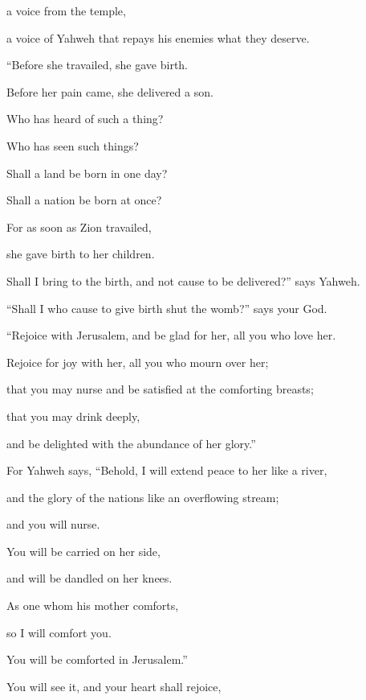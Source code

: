 {\par }{\QB a voice from the temple,
\par }{\QB a voice of Yahweh that repays his enemies what they deserve.
\par }{\BB \par }{\Q {}“Before she travailed, she gave birth.
\par }{\QB Before her pain came, she delivered a son.
\par }{\Q {}Who has heard of such a thing?
\par }{\QB Who has seen such things?
\par }{\Q Shall a land be born in one day?
\par }{\QB Shall a nation be born at once?
\par }{\Q For as soon as Zion travailed,
\par }{\QB she gave birth to her children.
\par }{\Q {}Shall I bring to the birth, and not cause to be delivered?” says Yahweh.
\par }{\QB “Shall I who cause to give birth shut the womb?” says your God.
\par }{\BB \par }{\Q {}“Rejoice with Jerusalem, and be glad for her, all you who love her.
\par }{\QB Rejoice for joy with her, all you who mourn over her;
\par }{\Q {}that you may nurse and be satisfied at the comforting breasts;
\par }{\QB that you may drink deeply,
\par }{\QB and be delighted with the abundance of her glory.”
\par }{\BB \par }{\Q {}For Yahweh says, “Behold, I will extend peace to her like a river,
\par }{\QB and the glory of the nations like an overflowing stream;
\par }{\QB and you will nurse.
\par }{\Q You will be carried on her side,
\par }{\QB and will be dandled on her knees.
\par }{\Q {}As one whom his mother comforts,
\par }{\QB so I will comfort you.
\par }{\QB You will be comforted in Jerusalem.”
\par }{\BB \par }{\Q {}You will see it, and your heart shall rejoice,
}
